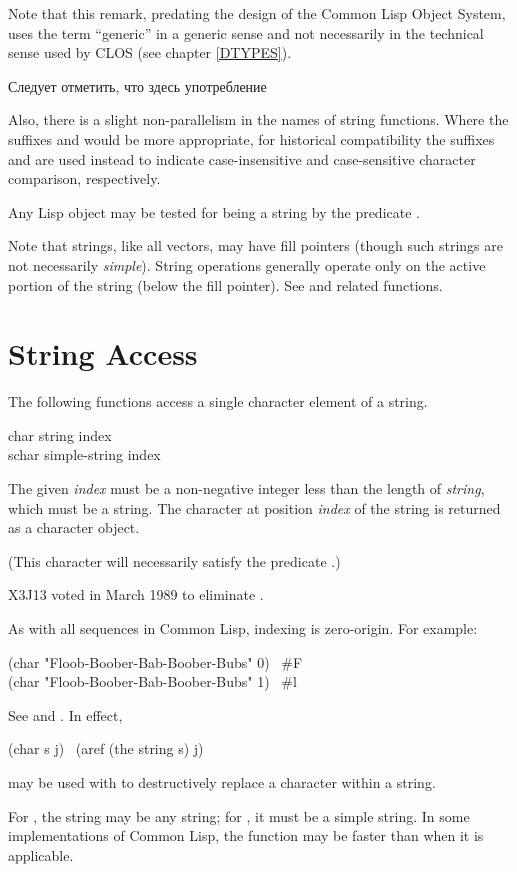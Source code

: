 \begin{new}
Note that this remark, predating the design of the Common Lisp Object System,
uses the term ``generic'' in a generic sense and not necessarily
in the technical sense used by CLOS
(see chapter \ref{DTYPES}).

Следует отметить, что здесь употребление 
\end{new}

Also, there is a slight non-parallelism in the names of string functions.
Where the suffixes  and  would be more appropriate,
for historical compatibility the suffixes  and \cd{=} are used instead
to indicate case-insensitive and case-sensitive character comparison,
respectively.

Any Lisp object may be tested for being a string by
the predicate .

Note that strings, like all vectors, may have fill pointers
(though such strings are not necessarily \emph{simple}).
String operations generally operate only on the active portion of the string
(below the fill pointer).  See  and related
functions.

\section{String Access}

The following functions access a single character element of a string.

\begin{defun}[Function]
char string index \\
schar simple-string index

The given \emph{index} must be a non-negative integer less than
the length of \emph{string}, which must be a
string.  The character at position \emph{index}
of the string is returned as a character object.
\begin{obsolete}
(This character will necessarily satisfy the predicate .)
\end{obsolete}
\begin{newer}
X3J13 voted in March 1989 
to eliminate .
\end{newer}
As with all sequences in Common Lisp, indexing is zero-origin.
For example:
\begin{lisp}
(char "Floob-Boober-Bab-Boober-Bubs" 0) \EV\ \#{\Xbackslash}F \\
(char "Floob-Boober-Bab-Boober-Bubs" 1) \EV\ \#{\Xbackslash}l
\end{lisp}
See  and .  In effect,
\begin{lisp}
(char s j) \EQ\ (aref (the string s) j)
\end{lisp}
 may be used with  to destructively replace
a character within a string.

For , the string may be any string;
for , it must be a simple string.
In some implementations of Common Lisp, the function  may
be faster than  when it is applicable.
\end{defun}

